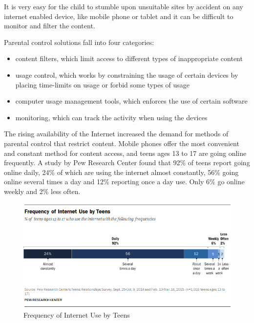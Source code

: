 It is very easy for the child to stumble upon unsuitable sites by accident on any internet enabled device, like mobile phone or tablet and it can be difficult to monitor and filter the content. \parencite{innapropriateContent}

Parental control solutions fall into four categories:

\begin{itemize}
\item content filters, which limit access to different types of inappropriate content
\item usage control, which works by constraining the usage of certain devices by placing time-limits on usage or forbid some types of usage
\item computer usage management tools, which enforces the use of certain software
\item monitoring, which can track the activity when using the devices
\end{itemize}

The rising availability of the Internet increased the demand for methods of parental control that restrict content. Mobile phones offer the most convenient and constant method for content access, and teens ages 13 to 17 are going online frequently. A study by Pew Research Center found that 92\% of teens report going online daily, 24\% of which are using the internet almost constantly, 56\% going online several times a day and 12\% reporting once a day use. Only 6\% go online weekly and 2\% less often. \parencite{lenhart2015teens}

\begin{figure}[th]
\centering
\includegraphics{Figures/frequency-of-internet-use-by-teens}
\decoRule
\caption[Frequency of Internet Use by Teens]{Frequency of Internet Use by Teens}
\label{fig:frequency-of-internet-use-by-teens}
\end{figure}


